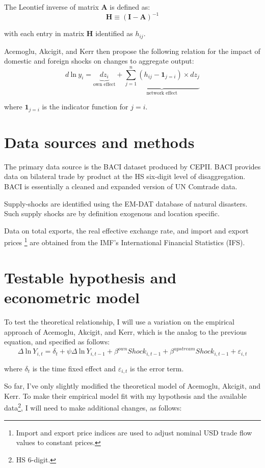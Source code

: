 \documentclass[10pt,letterpaper]{article}
\begin{document}
The Leontief inverse of matrix \textbf{A} is defined as:
$$ \mathbf{H} \equiv (\mathbf{I} - \mathbf{A})^{-1} $$

with each entry in matrix \textbf{H} identified as $h_{ij}$.

Acemoglu, Akcigit, and Kerr then propose the following relation for the impact of domestic and foreign shocks on changes to aggregate output:
$$ d \ \text{ln} \ y_i = \underbrace{dz_i}_{\text{own effect}} + \underbrace{\sum_{j=1}^{n} (h_{ij} - \bm{1}_{j=i}) \times dz_j}_{\text{network effect}}$$

where $\bm{1}_{j=i}$ is the indicator function for $j=i$.
\section{Data sources and methods}
The primary data source is the BACI dataset produced by CEPII. BACI provides data on bilateral trade by product at the HS six-digit level of disaggregation. BACI is essentially a cleaned and expanded version of UN Comtrade data. 

Supply-shocks are identified using the EM-DAT database of natural disasters. Such supply shocks are by definition exogenous and location specific. 

Data on total exports, the real effective exchange rate, and import and export prices \footnote{Import and export price indices are used to adjust nominal USD trade flow values to constant prices.} are obtained from the IMF's International Financial Statistics (IFS).


\section{Testable hypothesis and econometric model}

To test the theoretical relationship, I will use a variation on the empirical approach of Acemoglu, Akcigit, and Kerr, which is the analog to the previous equation, and specified as follows:
$$ \Delta \ \text{ln} \ Y_{i,t} = \delta_t + \psi \Delta \ \text{ln} \ Y_{i,t-1} + \beta^{own}Shock_{i,t-1} + \beta^{upstream}Shock_{i,t-1} + \varepsilon_{i,t}$$

where $\delta_t$ is the time fixed effect and $\varepsilon_{i,t}$ is the error term. 

So far, I've only slightly modified the theoretical model of Acemoglu, Akcigit, and Kerr. To make their empirical model fit with my hypothesis and the available data\footnote{HS 6-digit.}, I will need to make additional changes, as follows:
\end{document}
